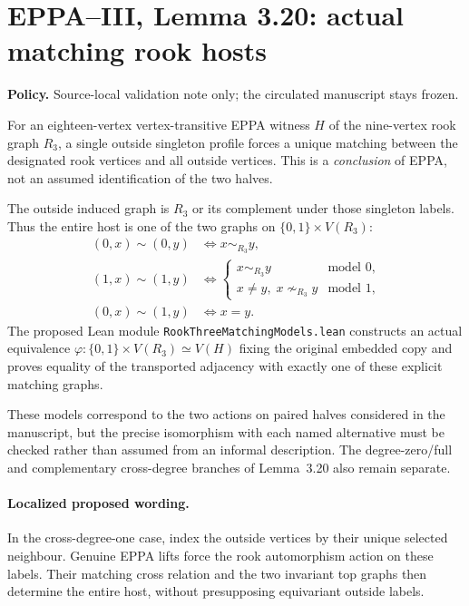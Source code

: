 \documentclass[11pt]{article}
\begin{document}
\section*{EPPA--III, Lemma 3.20: actual matching rook hosts}
\textbf{Policy.} Source-local validation note only;
the circulated manuscript stays frozen.

For an eighteen-vertex vertex-transitive EPPA witness
\(H\) of the nine-vertex rook graph \(R_3\), a single
outside singleton profile forces a unique matching
between the designated rook vertices and all outside
vertices. This is a \emph{conclusion} of EPPA, not an
assumed identification of the two halves.

The outside induced graph is \(R_3\) or its complement
under those singleton labels. Thus the entire host is
one of the two graphs on \(\{0,1\}\times V(R_3)\):
\[
\begin{aligned}
 (0,x)\sim(0,y)&\iff x\sim_{R_3}y,\\
 (1,x)\sim(1,y)&\iff
    \begin{cases}x\sim_{R_3}y&\text{model 0},\\
    x\ne y,\; x\nsim_{R_3}y&\text{model 1},\end{cases}\\
 (0,x)\sim(1,y)&\iff x=y.
\end{aligned}
\]
The proposed Lean module
\texttt{RookThreeMatchingModels.lean} constructs an
actual equivalence \(\varphi:\{0,1\}\times V(R_3)
\simeq V(H)\) fixing the original embedded copy
and proves equality of the transported adjacency
with exactly one of these explicit matching graphs.

These models correspond to the two actions on paired
halves considered in the manuscript, but the precise
isomorphism with each named alternative must be
checked rather than assumed from an informal description.
The degree-zero/full and complementary cross-degree
branches of Lemma~3.20 also remain separate.

\paragraph{Localized proposed wording.}
In the cross-degree-one case, index the outside
vertices by their unique selected neighbour.
Genuine EPPA lifts force the rook automorphism action
on these labels. Their matching cross relation and the
two invariant top graphs then determine the entire host,
without presupposing equivariant outside labels.
\end{document}
